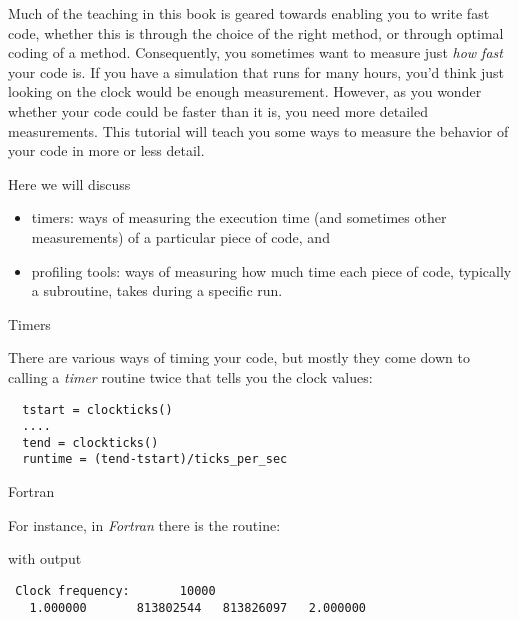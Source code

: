 
Much of the teaching in this book is geared towards enabling you to
write fast code, whether this is through the choice of the right
method, or through optimal coding of a method. Consequently, you
sometimes want to measure just \emph{how fast} your code is. If you
have a simulation that runs for many hours, you'd think just looking
on the clock would be enough measurement. However, as you wonder
whether your code could be faster than it is, you need more detailed
measurements. This tutorial will teach you some ways to measure the
behavior of your code in more or less detail.

Here we will discuss 
\begin{itemize}
\item timers: ways of measuring the execution time (and sometimes
  other measurements) of a particular piece of code, and
\item profiling tools: ways of measuring how much time each piece of
  code, typically a subroutine, takes during a specific run.
\end{itemize}

 {Timers}
\label{sec:perf-timers}

There are various ways of timing your code, but mostly they come down
to calling a \emph{timer} routine twice that tells you the clock values:
\begin{verbatim}
  tstart = clockticks()
  ....
  tend = clockticks()
  runtime = (tend-tstart)/ticks_per_sec
\end{verbatim}

 {Fortran}

For instance, in \emph{Fortran} there is the 
routine:

with output
\begin{verbatim}
 Clock frequency:       10000
   1.000000       813802544   813826097   2.000000  
\end{verbatim}

